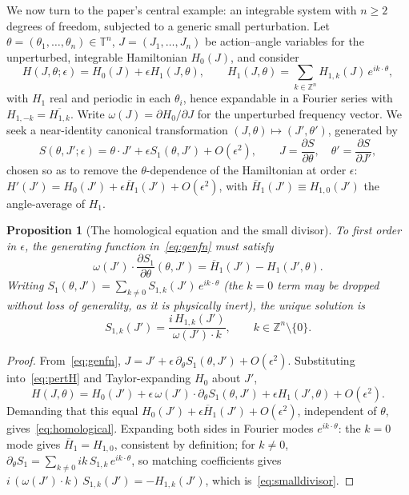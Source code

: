 \documentclass[11pt]{article}
\newtheorem{proposition}{Proposition}
\begin{document}
We now turn to the paper's central example: an integrable system with $n\ge2$ degrees of freedom, subjected to a generic small perturbation. Let $\theta=(\theta_1,\dots,\theta_n)\in\mathbb T^n$, $J=(J_1,\dots,J_n)$ be action--angle variables for the unperturbed, integrable Hamiltonian $H_0(J)$, and consider
\begin{equation}
H(J,\theta;\epsilon)=H_0(J)+\epsilon H_1(J,\theta),\qquad H_1(J,\theta)=\sum_{k\in\mathbb Z^n}H_{1,k}(J)\,e^{ik\cdot\theta} ,
\label{eq:pertH}
\end{equation}
with $H_1$ real and periodic in each $\theta_i$, hence expandable in a Fourier series with $H_{1,-k}=\overline{H_{1,k}}$. Write $\omega(J)=\partial H_0/\partial J$ for the unperturbed frequency vector. We seek a near-identity canonical transformation $(J,\theta)\mapsto(J',\theta')$, generated by
\begin{equation}
S(\theta,J';\epsilon)=\theta\cdot J'+\epsilon S_1(\theta,J')+O(\epsilon^2),\qquad J=\frac{\partial S}{\partial\theta},\quad \theta'=\frac{\partial S}{\partial J'},
\label{eq:genfn}
\end{equation}
chosen so as to remove the $\theta$-dependence of the Hamiltonian at order $\epsilon$: $H'(J')=H_0(J')+\epsilon\overline{H}_1(J')+O(\epsilon^2)$, with $\overline H_1(J')\equiv H_{1,0}(J')$ the angle-average of $H_1$.

\begin{proposition}[The homological equation and the small divisor]
To first order in $\epsilon$, the generating function in~\eqref{eq:genfn} must satisfy
\begin{equation}
\omega(J')\cdot\frac{\partial S_1}{\partial\theta}(\theta,J')=\overline H_1(J')-H_1(J',\theta) .
\label{eq:homological}
\end{equation}
Writing $S_1(\theta,J')=\sum_{k\neq0}S_{1,k}(J')\,e^{ik\cdot\theta}$ (the $k=0$ term may be dropped without loss of generality, as it is physically inert), the unique solution is
\begin{equation}
S_{1,k}(J')=\frac{i\,H_{1,k}(J')}{\omega(J')\cdot k},\qquad k\in\mathbb Z^n\setminus\{0\}.
\label{eq:smalldivisor}
\end{equation}
\end{proposition}

\begin{proof}
From~\eqref{eq:genfn}, $J=J'+\epsilon\,\partial_\theta S_1(\theta,J')+O(\epsilon^2)$. Substituting into~\eqref{eq:pertH} and Taylor-expanding $H_0$ about $J'$,
\[
H(J,\theta)=H_0(J')+\epsilon\,\omega(J')\cdot\partial_\theta S_1(\theta,J')+\epsilon H_1(J',\theta)+O(\epsilon^2).
\]
Demanding that this equal $H_0(J')+\epsilon\overline H_1(J')+O(\epsilon^2)$, independent of $\theta$, gives~\eqref{eq:homological}. Expanding both sides in Fourier modes $e^{ik\cdot\theta}$: the $k=0$ mode gives $\overline H_1=H_{1,0}$, consistent by definition; for $k\neq0$, $\partial_\theta S_1=\sum_{k\neq0}ik\,S_{1,k}\,e^{ik\cdot\theta}$, so matching coefficients gives $i\,(\omega(J')\cdot k)\,S_{1,k}(J')=-H_{1,k}(J')$, which is~\eqref{eq:smalldivisor}.
\end{proof}
\end{document}
